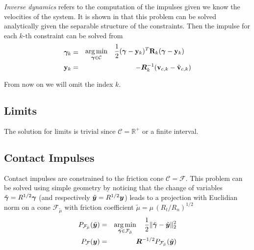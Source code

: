 \textit{Inverse dynamics} refers to the computation of the impulses given we
know the velocities of the system. It is shown in \cite{bib:todorov2014} that
this problem can be solved analytically given the separable structure of the
constraints. Then the impulse for each $k\text{-th}$ constraint can be solved
from
\begin{eqnarray}
	{\bm\gamma}_k&=&
	\begin{aligned}
		\operatorname*{arg\,min}_{{\bm\gamma}\in\mathcal{C}} \quad &
	\frac{1}{2}({\bm\gamma}-{\mathbf{y}}_k)^T{\mathbf{R}}_k({\bm\gamma}-{\mathbf{y}}_k) \end{aligned}\\
	{\mathbf{y}}_k &=& -{\bm{R}}_k^{-1}({\mathbf{v}}_{c,k}-\hat{{\mathbf{v}}}_{c,k})
\end{eqnarray}

From now on we will omit the index $k$. 

\subsection{Limits}
The solution for limits is trivial since $\mathcal{C}=\mathbb{R}^+$ or a finite
interval. 

\subsection{Contact Impulses}

Contact impulses are constrained to the friction cone $\mathcal{C}=\mathcal{F}$.
This problem can be solved using simple geometry by noticing that the change of
variables $\tilde{{\bm\gamma}}=R^{1/2}{\bm\gamma}$ (and respectively
$\tilde{{\bm{y}}}=R^{1/2}{\bm{y}}$) leads to a projection with Euclidian norm on a
cone $\mathcal{F}_{\tilde\mu}$ with friction coefficient
$\tilde\mu=\mu\,(R_t/R_n)^{1/2}$
\begin{eqnarray}
	P_\mathcal{F_{\tilde\mu}}(\tilde{\vf{y}})&=&\argmin_{\tilde\bgamma\in\mathcal{F_{\tilde\mu}}}
		\quad \frac{1}{2}\Vert\tilde\bgamma-\tilde{\vf{y}}\Vert_2^2\nonumber\\
	P_\mathcal{F}(\vf{y}) &=&
	\vf{R}^{-1/2}P_\mathcal{F_{\tilde\mu}}(\tilde{\vf{y}})
	\label{eq:local_optimization_problem_tilde}
\end{eqnarray}

